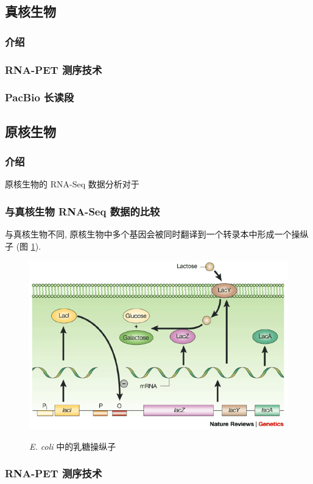 \subsection{真核生物}

\subsubsection{介绍} %

\subsubsection{RNA-PET 测序技术} %

\subsubsection{PacBio 长读段} %

\subsection{原核生物}

\subsubsection{介绍} %
原核生物的 RNA-Seq 数据分析对于

\subsubsection{与真核生物 RNA-Seq 数据的比较} %
与真核生物不同, 原核生物中多个基因会被同时翻译到一个转录本中形成一个操纵子 
(图 \ref{e.coli.lactose.operon}).

\begin{figure}[!t]
\centering
\includegraphics[width=\textwidth]{figures/disc/e-coli-lactose-operon.png}
\label{e.coli.lactose.operon}
\caption{\textit{E. coli} 中的乳糖操纵子 \cite{shuman2003art}}
\end{figure}

\subsubsection{RNA-PET 测序技术} %





